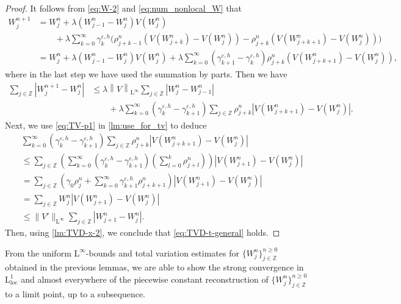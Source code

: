 \documentclass[10pt]{amsart}
\theoremstyle{plain}
\theoremstyle{definition}
\numberwithin{equation}{section}
\newcommand{\eps}{{\varepsilon}}
\newcommand{\norm}[1]{\left\lVert#1\right\rVert}
\begin{document}
\begin{proof}
It follows from \cref{eq:W-2} and \cref{eq:num_nonlocal_W} that
\begin{align*}
    W_j^{n+1} &= W_j^n + \lambda ( W_{j-1}^n - W_j^n ) V(W_j^n)  \\
    &\qquad + \lambda \sum_{k=0}^\infty \gamma_k^{\eps,h} \Big( \rho_{j+k-1}^n \left( V(W_{j+k}^n) - V(W_j^n) \right) - \rho_{j+k}^n \left( V(W_{j+k+1}^n) - V(W_j^n) \right) \Big) \\
    &= W_j^n + \lambda ( W_{j-1}^n - W_j^n ) V(W_j^n) + \lambda \sum_{k=0}^\infty \left(\gamma_{k+1}^{\eps,h}-\gamma_k^{\eps,h}\right) \rho_{j+k}^n \left( V(W_{j+k+1}^n) - V(W_j^n) \right),
\end{align*}
where in the last step we have used the summation by parts.
Then we have
\begin{align*}
    \sum_{j\in\mathbb{Z}} |W_j^{n+1}-W_j^n| &\leq \lambda \norm{V}_{\mathrm{L}^\infty} \sum_{j\in\mathbb{Z}} |W_j^n-W_{j-1}^n| \\ & \qquad  + \lambda \sum_{k=0}^\infty \left(\gamma_k^{\eps,h}-\gamma_{k+1}^{\eps,h}\right) \sum_{j\in\mathbb{Z}} \rho_{j+k}^n \left| V(W_{j+k+1}^n) - V(W_j^n) \right|.
\end{align*}
Next, we use \cref{eq:TV-p1} in \cref{lm:use_for_tv} to deduce
\begin{align*}
    &\sum_{k=0}^\infty \left(\gamma_k^{\eps,h}-\gamma_{k+1}^{\eps,h}\right) \sum_{j\in\mathbb{Z}} \rho_{j+k}^n \left| V(W_{j+k+1}^n) - V(W_j^n) \right| \\
    &\leq \sum_{j\in\mathbb{Z}} \left( \sum_{k=0}^\infty \left(\gamma_k^{\eps,h}-\gamma_{k+1}^{\eps,h}\right) \left(\sum_{l=0}^k \rho_{j+l}^n\right) \right) |V(W_{j+1}^n) -V(W_j^n)| \\
    &= \sum_{j\in\mathbb{Z}} \left( \gamma_0\rho_j^n + \sum_{k=0}^\infty \gamma_{k+1}^{\eps,h} \rho_{j+k+1}^n \right) |V(W_{j+1}^n) -V(W_j^n)| \\
    &= \sum_{j\in\mathbb{Z}} W_j^n |V(W_{j+1}^n) -V(W_j^n)| \\
    &\leq \|V'\|_{\mathrm{L}^\infty} \sum_{j\in\mathbb{Z}} |W_{j+1}^n-W_j^n|.
\end{align*}
Then, using \cref{lm:TVD-x-2}, we conclude that \cref{eq:TVD-t-general} holds.
\end{proof}

From the uniform $\mathrm{L}^\infty$-bounds and total variation estimates for $\{W_j^n\}_{j\in\mathbb{Z}}^{n\geq0}$ obtained in the previous lemmas, we are able to show the strong convergence in $\mathrm{L}^1_{\mathrm{loc}}$ and almost everywhere of the piecewise constant reconstruction of $\{W_j^n\}_{j\in\mathbb{Z}}^{n\geq0}$ to a limit point, up to a subsequence. 
\end{document}
